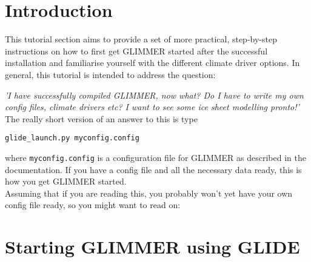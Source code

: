 \section{Introduction}
This tutorial section aims to provide a set of more practical, step-by-step
instructions on how to first get GLIMMER started after the successful
installation and familiarise yourself with the different climate driver
options. In general, this tutorial is intended to address the question:

\emph{'I have successfully compiled GLIMMER, now what? Do I have to write my
own config files, climate drivers etc? I want to see some ice sheet modelling
pronto!'}\\

The really short version of an answer to this is type
\begin{verbatim}
glide_launch.py myconfig.config
\end{verbatim}
where \texttt{myconfig.config} is a configuration file for GLIMMER as described
in the documentation. If you have a config file and all the necessary data
ready, this is how you get GLIMMER started. \\
Assuming that if you are reading this, you probably won't yet have your own config
file ready, so you might want to read on:

\section{Starting GLIMMER using GLIDE}
